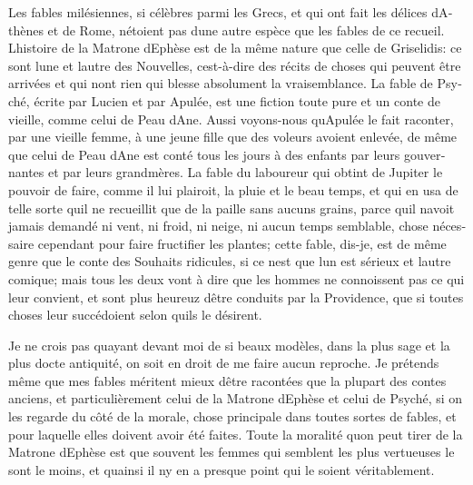 \documentclass[14pt,a4paper]{memoir}
\begin{document}
\begin{otherlanguage}{french}
Les fables milésiennes, si célèbres parmi les Grecs, et qui ont fait les
délices d\textquotesingle Athènes et de Rome, n\textquotesingle étoient
pas d\textquotesingle une autre espèce que les fables de ce recueil.
L\textquotesingle histoire de la Matrone d\textquotesingle Ephèse est de
la même nature que celle de Griselidis: ce sont l\textquotesingle une et
l\textquotesingle autre des Nouvelles, c\textquotesingle est-à-dire des
récits de choses qui peuvent être arrivées et qui n\textquotesingle ont
rien qui blesse absolument la vraisemblance. La fable de Psyché, écrite
par Lucien et par Apulée, est une fiction toute pure et un conte de
vieille, comme celui de Peau d\textquotesingle Ane. Aussi voyons-nous
qu\textquotesingle Apulée le fait raconter, par une vieille femme, à une
jeune fille que des voleurs avoient enlevée, de même que celui de Peau
d\textquotesingle Ane est conté tous les jours à des enfants par leurs
gouvernantes et par leurs grand\textquotesingle mères. La fable du
laboureur qui obtint de Jupiter le pouvoir de faire, comme il lui
plairoit, la pluie et le beau temps, et qui en usa de telle sorte
qu\textquotesingle il ne recueillit que de la paille sans aucuns grains,
parce qu\textquotesingle il n\textquotesingle avoit jamais demandé ni
vent, ni froid, ni neige, ni aucun temps semblable, chose nécessaire
cependant pour faire fructifier les plantes; cette fable, dis-je, est de
même genre que le conte des Souhaits ridicules, si ce
n\textquotesingle est que l\textquotesingle un est sérieux et
l\textquotesingle autre comique; mais tous les deux vont à dire que les
hommes ne connoissent pas ce qui leur convient, et sont plus heureuz
d\textquotesingle être conduits par la Providence, que si toutes choses
leur succédoient selon qu\textquotesingle ils le désirent.

Je ne crois pas qu\textquotesingle ayant devant moi de si beaux modèles,
dans la plus sage et la plus docte antiquité, on soit en droit de me
faire aucun reproche. Je prétends même que mes fables méritent mieux
d\textquotesingle être racontées que la plupart des contes anciens, et
particulièrement celui de la Matrone d\textquotesingle Ephèse et celui
de Psyché, si on les regarde du côté de la morale, chose principale dans
toutes sortes de fables, et pour laquelle elles doivent avoir été
faites. Toute la moralité qu\textquotesingle on peut tirer de la Matrone
d\textquotesingle Ephèse est que souvent les femmes qui semblent les
plus vertueuses le sont le moins, et qu\textquotesingle ainsi il
n\textquotesingle y en a presque point qui le soient véritablement.


\end{otherlanguage}
\end{document}
